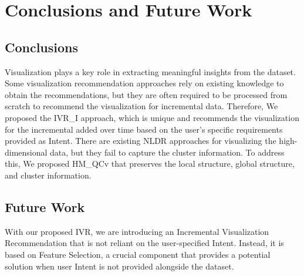\chapter{Conclusions and Future Work}

\section{Conclusions}

Visualization plays a key role in extracting meaningful insights from the dataset. Some visualization recommendation approaches rely on existing knowledge to obtain the recommendations, but they are often required to be processed from scratch to recommend the visualization for incremental data. Therefore, We proposed the IVR\_I approach, which is unique and recommends the visualization for the incremental added over time based on the user's specific requirements provided as Intent. There are existing NLDR approaches for visualizing the high-dimensional data, but they fail to capture the cluster information. To address this, We proposed HM\_QCv that preserves the local structure, global structure, and cluster information. 

\section{Future Work}

With our proposed IVR, we are introducing an Incremental Visualization Recommendation that is not reliant on the user-specified Intent. Instead, it is based on Feature Selection, a crucial component that provides a potential solution when user Intent is not provided alongside the dataset.